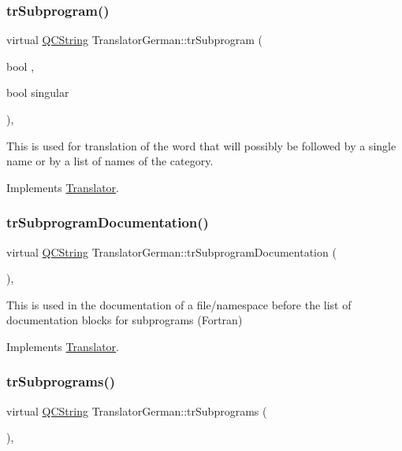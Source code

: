 \subsubsection{\texorpdfstring{trSubprogram()}{trSubprogram()}}
{\footnotesize\ttfamily virtual \mbox{\hyperlink{class_q_c_string}{Q\+C\+String}} Translator\+German\+::tr\+Subprogram (\begin{DoxyParamCaption}\item[{bool}]{,  }\item[{bool}]{singular }\end{DoxyParamCaption})\hspace{0.3cm}{\ttfamily [inline]}, {\ttfamily [virtual]}}

This is used for translation of the word that will possibly be followed by a single name or by a list of names of the category. 

Implements \mbox{\hyperlink{class_translator}{Translator}}.

\mbox{\label{class_translator_german_acdd716a7d9be814b56e7f4ae52a092d1}} 
\subsubsection{\texorpdfstring{trSubprogramDocumentation()}{trSubprogramDocumentation()}}
{\footnotesize\ttfamily virtual \mbox{\hyperlink{class_q_c_string}{Q\+C\+String}} Translator\+German\+::tr\+Subprogram\+Documentation (\begin{DoxyParamCaption}{ }\end{DoxyParamCaption})\hspace{0.3cm}{\ttfamily [inline]}, {\ttfamily [virtual]}}

This is used in the documentation of a file/namespace before the list of documentation blocks for subprograms (Fortran) 

Implements \mbox{\hyperlink{class_translator}{Translator}}.

\mbox{\label{class_translator_german_aebb5cb6e1a2aca58e37bb2fd8b725862}} 
\subsubsection{\texorpdfstring{trSubprograms()}{trSubprograms()}}
{\footnotesize\ttfamily virtual \mbox{\hyperlink{class_q_c_string}{Q\+C\+String}} Translator\+German\+::tr\+Subprograms (\begin{DoxyParamCaption}{ }\end{DoxyParamCaption})\hspace{0.3cm}{\ttfamily [inline]}, {\ttfamily [virtual]}}

